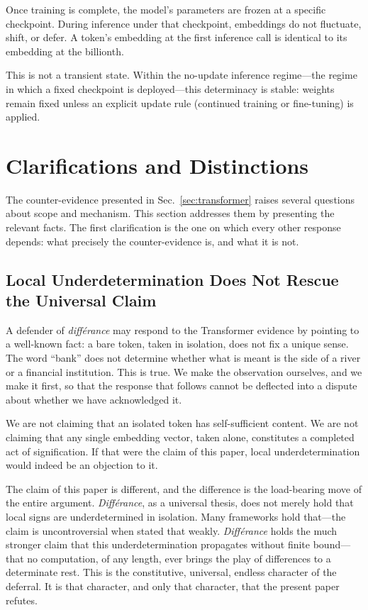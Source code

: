 \documentclass[a4paper,twocolumn,11pt]{article}
\begin{document}
Once training is complete, the model's parameters are frozen at a specific checkpoint. During inference under that checkpoint, embeddings do not fluctuate, shift, or defer. A token's embedding at the first inference call is identical to its embedding at the billionth.

This is not a transient state. Within the no-update inference regime---the regime in which a fixed checkpoint is deployed---this determinacy is stable: weights remain fixed unless an explicit update rule (continued training or fine-tuning) is applied.



\section{Clarifications and Distinctions}
\label{sec:clarifications}

The counter-evidence presented in Sec.~\ref{sec:transformer} raises several questions about scope and mechanism. This section addresses them by presenting the relevant facts. The first clarification is the one on which every other response depends: what precisely the counter-evidence is, and what it is not.

\subsection{Local Underdetermination Does Not Rescue the Universal Claim}
\label{sec:underdetermination}

A defender of \emph{diff\'erance} may respond to the Transformer evidence by pointing to a well-known fact: a bare token, taken in isolation, does not fix a unique sense. The word ``bank'' does not determine whether what is meant is the side of a river or a financial institution. This is true. We make the observation ourselves, and we make it first, so that the response that follows cannot be deflected into a dispute about whether we have acknowledged it.

We are not claiming that an isolated token has self-sufficient content. We are not claiming that any single embedding vector, taken alone, constitutes a completed act of signification. If that were the claim of this paper, local underdetermination would indeed be an objection to it.

The claim of this paper is different, and the difference is the load-bearing move of the entire argument. \emph{Diff\'erance}, as a universal thesis, does not merely hold that local signs are underdetermined in isolation. Many frameworks hold that---the claim is uncontroversial when stated that weakly. \emph{Diff\'erance} holds the much stronger claim that this underdetermination propagates without finite bound---that no computation, of any length, ever brings the play of differences to a determinate rest. This is the constitutive, universal, endless character of the deferral. It is that character, and only that character, that the present paper refutes.
\end{document}
